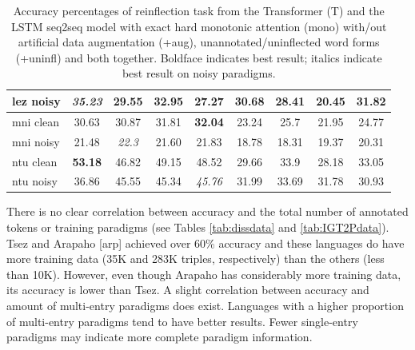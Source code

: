 \begin{table}[!tb]
\begin{tabular}{l|cccc|cccc}
      lez noisy & \textit{35.23} & 29.55 & 32.95 & 27.27          & 30.68 & 28.41 & 20.45 & 31.82 \\
      \hline
      mni clean & 30.63 & 30.87         & 31.81 & \textbf{32.04} & 23.24 & 25.7 & 21.95 & 24.77 \\
      mni noisy & 21.48 & \textit{22.3} & 21.60 & 21.83          & 18.78 & 18.31 & 19.37 & 20.31 \\
      \hline
      ntu clean & \textbf{53.18} & 46.82 & 49.15 & 48.52          & 29.66 & 33.9 & 28.18 & 33.05 \\
      ntu noisy & 36.86          & 45.55 & 45.34 & \textit{45.76} & 31.99 & 33.69 & 31.78 & 30.93 \\
    \end{tabular}
    \caption[IGT2P Results]{Accuracy percentages of reinflection task from the Transformer (T) and the LSTM seq2seq model with exact hard monotonic attention (mono) with/out artificial data augmentation (+aug), unannotated/uninflected word forms (+uninfl) and both together. Boldface indicates best result; italics indicate best result on noisy paradigms.}
    \label{tab:IGT2Presults}
\end{table}

There is no clear correlation between accuracy and the total number of annotated tokens or training paradigms (see Tables \ref{tab:dissdata} and \ref{tab:IGT2Pdata}). Tsez and Arapaho [arp] achieved over 60\% accuracy and these languages do have more training data (35K and 283K triples, respectively) than the others (less than 10K). However, even though Arapaho has considerably more training data, its accuracy is lower than Tsez. A slight correlation between accuracy and amount of multi-entry paradigms does exist. Languages with a higher proportion of multi-entry paradigms tend to have better results. Fewer single-entry paradigms may indicate more complete paradigm information.

